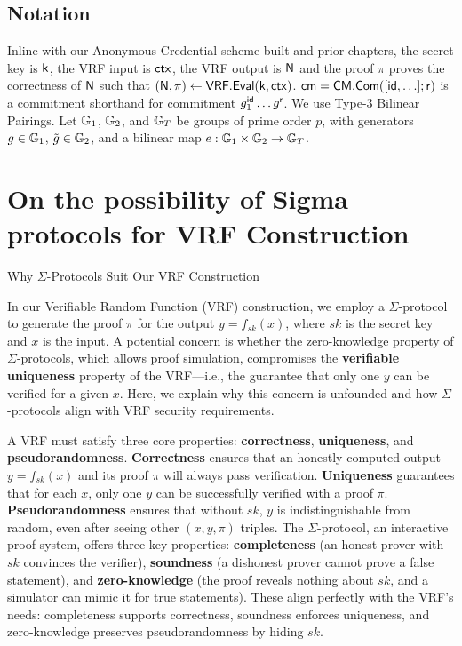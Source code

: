 \subsection*{Notation}
Inline with our Anonymous Credential scheme built and prior chapters, the secret key is $\mathsf{k}$, the VRF input is $\mathsf{ctx}$, the VRF output is $\mathsf{N}$ and the proof $\pi$ proves the correctness of $\mathsf{N}$ such that $(\mathsf{N}, \pi) \gets \mathsf{VRF.Eval}(\mathsf{k}, \mathsf{ctx})$. $\mathsf{cm} = \mathsf{CM.Com}([\mathsf{id},\ldots];\mathsf{r})$ is a commitment shorthand for commitment $g_1^{\mathsf{id}} \ldots g^{\mathsf{r}}$. We use Type-3 Bilinear Pairings. Let $\mathbb{G}_1$, $\mathbb{G}_2$, and $\mathbb{G}_T$ be groups of prime order $p$, with generators $g \in \mathbb{G}_1$, $\tilde{g} \in \mathbb{G}_2$, and a bilinear map $e: \mathbb{G}_1 \times \mathbb{G}_2 \to \mathbb{G}_T$.


\section{On the possibility of Sigma protocols for VRF Construction}
Why $\Sigma$-Protocols Suit Our VRF Construction

In our Verifiable Random Function (VRF) construction, we employ a $\Sigma$-protocol to generate the proof $\pi$ for the output $y = f_{sk}(x)$, where $sk$ is the secret key and $x$ is the input. A potential concern is whether the zero-knowledge property of $\Sigma$-protocols, which allows proof simulation, compromises the \textbf{verifiable uniqueness} property of the VRF—i.e., the guarantee that only one $y$ can be verified for a given $x$. Here, we explain why this concern is unfounded and how $\Sigma$-protocols align with VRF security requirements.

A VRF must satisfy three core properties: \textbf{correctness}, \textbf{uniqueness}, and \textbf{pseudorandomness}. \textbf{Correctness} ensures that an honestly computed output $y = f_{sk}(x)$ and its proof $\pi$ will always pass verification. \textbf{Uniqueness} guarantees that for each $x$, only one $y$ can be successfully verified with a proof $\pi$. \textbf{Pseudorandomness} ensures that without $sk$, $y$ is indistinguishable from random, even after seeing other $(x, y, \pi)$ triples. The $\Sigma$-protocol, an interactive proof system, offers three key properties: \textbf{completeness} (an honest prover with $sk$ convinces the verifier), \textbf{soundness} (a dishonest prover cannot prove a false statement), and \textbf{zero-knowledge} (the proof reveals nothing about $sk$, and a simulator can mimic it for true statements). These align perfectly with the VRF's needs: completeness supports correctness, soundness enforces uniqueness, and zero-knowledge preserves pseudorandomness by hiding $sk$.

